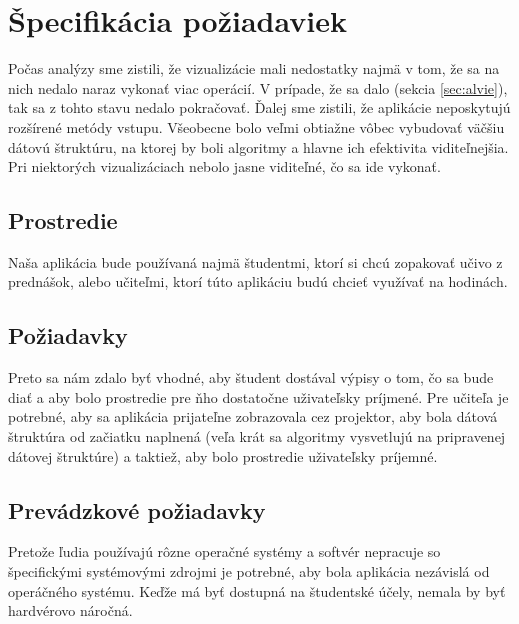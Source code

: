 
\section{Špecifikácia požiadaviek}

Počas analýzy sme zistili, že vizualizácie mali nedostatky najmä v tom, že sa 
na nich nedalo naraz vykonať viac operácií. V prípade, že sa dalo (sekcia 
\ref{sec:alvie}), tak sa z tohto stavu nedalo pokračovať. Ďalej sme zistili, 
že aplikácie neposkytujú rozšírené metódy vstupu. Všeobecne bolo veľmi 
obtiažne vôbec vybudovať väčšiu dátovú štruktúru, na ktorej by boli algoritmy 
a hlavne ich efektivita viditeľnejšia. Pri niektorých vizualizáciach nebolo 
jasne viditeľné, čo sa ide vykonať.

\subsection{Prostredie}

Naša aplikácia bude používaná najmä študentmi, ktorí si chcú zopakovať učivo 
z prednášok, alebo učiteľmi, ktorí túto aplikáciu budú chcieť využívať na 
hodinách.

\subsection{Požiadavky}

Preto sa nám zdalo byť vhodné, aby študent dostával výpisy o tom, čo sa bude 
diať a aby bolo prostredie pre ňho dostatočne uživateľsky príjmené. Pre 
učiteľa je potrebné, aby sa aplikácia prijateľne zobrazovala cez projektor, 
aby bola dátová štruktúra od začiatku naplnená (veľa krát sa algoritmy 
vysvetlujú na pripravenej dátovej štruktúre) a taktiež, aby bolo prostredie 
uživateľsky príjemné.

\subsection{Prevádzkové požiadavky}

Pretože ľudia používajú rôzne operačné systémy a softvér nepracuje so 
špecifickými systémovými zdrojmi je potrebné, aby bola aplikácia nezávislá 
od operáčného systému. Keďže má byť dostupná na študentské účely, nemala by 
byť hardvérovo náročná.

